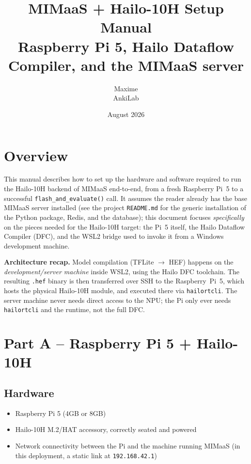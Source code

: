 \documentclass[11pt]{article}
\title{\textbf{MIMaaS + Hailo-10H Setup Manual}\\
\large Raspberry Pi 5, Hailo Dataflow Compiler, and the MIMaaS server}
\author{Maxime \\ AnkiLab}
\date{August 2026}
\begin{document}
\maketitle
\tableofcontents
\newpage

\section{Overview}

This manual describes how to set up the hardware and software required to
run the Hailo-10H backend of MIMaaS end-to-end, from a fresh Raspberry Pi~5
to a successful \texttt{flash\_and\_evaluate()} call. It assumes the reader
already has the base MIMaaS server installed (see the project
\texttt{README.md} for the generic installation of the Python package,
Redis, and the database); this document focuses \emph{specifically} on the
pieces needed for the Hailo-10H target: the Pi~5 itself, the Hailo Dataflow
Compiler (DFC), and the WSL2 bridge used to invoke it from a Windows
development machine.

\textbf{Architecture recap.} Model compilation (TFLite $\rightarrow$ HEF)
happens on the \emph{development/server machine} inside WSL2, using the
Hailo DFC toolchain. The resulting \texttt{.hef} binary is then transferred
over SSH to the Raspberry~Pi~5, which hosts the physical Hailo-10H module,
and executed there via \texttt{hailortcli}. The server machine never needs
direct access to the NPU; the Pi only ever needs \texttt{hailortcli} and the
runtime, not the full DFC.

\section{Part A -- Raspberry Pi 5 + Hailo-10H}

\subsection{Hardware}
\begin{itemize}
  \item Raspberry Pi 5 (4GB or 8GB)
  \item Hailo-10H M.2/HAT accessory, correctly seated and powered
  \item Network connectivity between the Pi and the machine running MIMaaS
    (in this deployment, a static link at \texttt{192.168.42.1})
\end{itemize}
\end{document}
